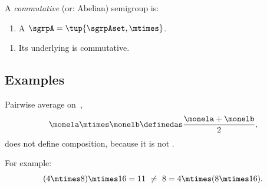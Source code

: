 \begin{definition}\label{def:commutative-semigroup}
    A \emph{commutative} (or: Abelian) semigroup is:

    \constit
    \begin{enumerate}
        \item A  $\sgrpA = \tup{\sgrpAset, \mtimes}$.
    \end{enumerate}

    \condit
    \begin{enumerate}
        \item Its underlying  is commutative.
    \end{enumerate}
\end{definition}

\subsection{Examples}


\begin{example}
    Pairwise average on~\reals,
    \begin{equation}
        \label{eq:pairwise}
        \monela \mtimes \monelb \definedas \frac{\monela + \monelb}{2},
    \end{equation}
    does not define  composition, because it is not .

    For example:
    \begin{equation}
        \label{eq:pairwise-counterexample}
        (4 \mtimes 8) \mtimes 16 = 11\ \neq\ 8 = 4 \mtimes (8 \mtimes 16).
    \end{equation}
\end{example}

